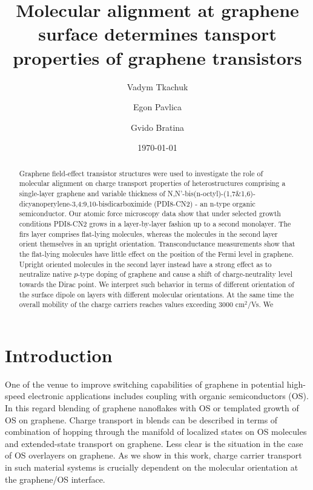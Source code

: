 \documentclass[preprint,aip,jap]{revtex4-2}
\begin{document}
\title{Molecular alignment at graphene surface determines tansport properties of graphene transistors}

\author{Vadym Tkachuk}%
\author{Egon Pavlica}%
\author{Gvido Bratina}%
%
\date{\today}

\begin{abstract}

  Graphene field-effect transistor structures were used to investigate the role of molecular alignment on charge transport properties of heterostructures comprising a single-layer graphene and variable thickness of N,N'-bis(n-octyl)-(1,7\&1,6)-dicyanoperylene-3,4:9,10-bisdicarboximide (PDI8-CN2) - an n-type organic semiconductor. Our atomic force microscopy data show that under selected growth conditions PDI8-CN2 grows in a layer-by-layer fashion up to a second monolayer. The firs layer comprises flat-lying molecules, whereas the molecules in the second layer orient themselves in an upright orientation. Transconductance measurements show that the flat-lying molecules have little effect on the position of the Fermi level in graphene. Upright oriented molecules in the second layer instead have a strong effect as to neutralize native $p$-type doping of graphene and cause a shift of charge-neutrality level towards the Dirac point. We interpret such behavior in terms of different orientation of the surface dipole on layers with different molecular orientations. At the same time the overall mobility of the charge carriers reaches values exceeding 3000 cm$^{2}$/Vs. We 
\end{abstract}


\maketitle

\section{\label{sec:intro}Introduction}

One of the venue to improve switching capabilities of graphene in potential high-speed electronic applications\cite{novoselov-2004} includes coupling with organic semiconductors (OS). In this regard  blending of graphene nanoflakes with OS\cite{pathipati-2019,pathipati-2015,pathipati-2014} or templated growth of OS on graphene\cite{zhou-2013a,nouchi-2008,nouchi-2014}. Charge transport in blends can be described in terms of combination of hopping through the manifold of localized states on OS molecules and extended-state transport on graphene. Less clear is the situation in the case of OS overlayers on graphene. As we show in this work, charge carrier transport in such material systems is crucially dependent on the molecular orientation at the graphene/OS interface.
\end{document}
